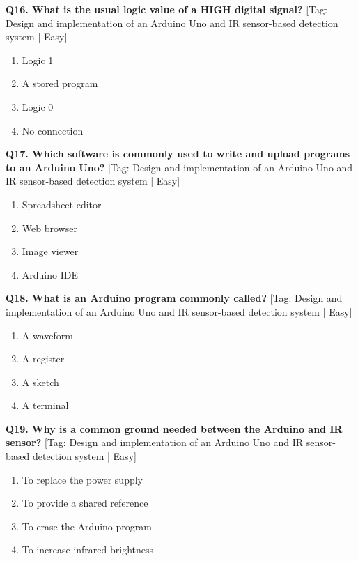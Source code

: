 \noindent\textbf{Q16. What is the usual logic value of a HIGH digital signal?} \hfill [Tag: Design and implementation of an Arduino Uno and IR sensor-based detection system | Easy]
\begin{enumerate}[label=(\alph*),topsep=2pt,itemsep=1pt,partopsep=0pt,parsep=0pt]
    \item {Logic 1}
    \item {A stored program}
    \item {Logic 0}
    \item {No connection}
\end{enumerate}
\vspace{2mm}

\noindent\textbf{Q17. Which software is commonly used to write and upload programs to an Arduino Uno?} \hfill [Tag: Design and implementation of an Arduino Uno and IR sensor-based detection system | Easy]
\begin{enumerate}[label=(\alph*),topsep=2pt,itemsep=1pt,partopsep=0pt,parsep=0pt]
    \item {Spreadsheet editor}
    \item {Web browser}
    \item {Image viewer}
    \item {Arduino IDE}
\end{enumerate}
\vspace{2mm}

\noindent\textbf{Q18. What is an Arduino program commonly called?} \hfill [Tag: Design and implementation of an Arduino Uno and IR sensor-based detection system | Easy]
\begin{enumerate}[label=(\alph*),topsep=2pt,itemsep=1pt,partopsep=0pt,parsep=0pt]
    \item {A waveform}
    \item {A register}
    \item {A sketch}
    \item {A terminal}
\end{enumerate}
\vspace{2mm}

\noindent\textbf{Q19. Why is a common ground needed between the Arduino and IR sensor?} \hfill [Tag: Design and implementation of an Arduino Uno and IR sensor-based detection system | Easy]
\begin{enumerate}[label=(\alph*),topsep=2pt,itemsep=1pt,partopsep=0pt,parsep=0pt]
    \item {To replace the power supply}
    \item {To provide a shared reference}
    \item {To erase the Arduino program}
    \item {To increase infrared brightness}
\end{enumerate}
\vspace{2mm}

